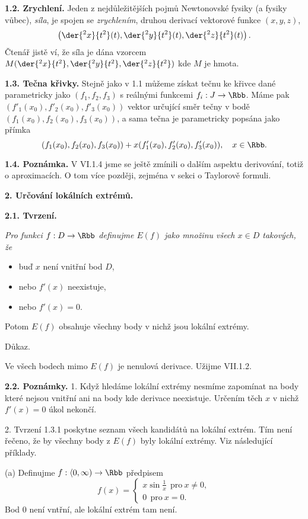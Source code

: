 \documentclass[12pt]{article}
\begin{document}
{{ \bigskip
 
 {\bf 1.2. Zrychlení.} Jeden z nejdůležitějších pojmů Newtonovské fysiky (a fysiky vůbec),   {\em síla}, je spojen se {\em zrychlením}, druhou derivací vektorové funkce $(x,y,z)$,
 $$
 \left(\der{^2x}{t^2}(t),\der{^2y}{t^2}(t),\der{^2z}{t^2}(t)\right).
 $$
Čtenář jistě ví, že síla je dána vzorcem
 $M(\der{^2x}{t^2},\der{^2y}{t^2},\der{^2z}{t^2})$ kde $M$ je hmota.
 
 \bigskip
 
 {\bf 1.3. Tečna křivky.} Stejně jako v 1.1 můžeme získat tečnu ke křivce dané parametricky jako $(f_1,f_2,f_3)$ s reálnými funkcemi $f_i:J\to\Rbb$. Máme pak $(f'_1(x_0),f'_2(x_0),f'_3(x_0))$ vektor určující směr tečny v bodě 
  $(f_1(x_0),f_2(x_0),f_3(x_0))$, a sama tečna je parametricky popsána jako přímka
  $$
 (f_1(x_0),f_2(x_0),f_3(x_0))+ x(f'_1(x_0),f'_2(x_0),f'_3(x_0)),\quad x\in\Rbb.
 $$
 
 \bigskip
 
 {\bf 1.4. Poznámka.} V VI.1.4 jsme se ještě zmínili o dalším aspektu derivování, totiž o aproximacích. O tom více později, zejména v sekci o Taylorově formuli. 
 
 
 \vskip10mm
 
 {\large\bf 2. Určování lokálních extrémů.}
 
 \bigskip
 
 
 {\bf 2.1.  Tvrzení.} {\em Pro funkci $f:D\to \Rbb$ definujme $E(f)$ jako množinu všech $x\in D$ takových, že
 \begin{itemize}
 \item  buď $x$ není vnitřní bod $D$, 
 \item nebo $f'(x)$ neexistuje,
 \item nebo $f'(x)=0$. 
 \end{itemize}
     Potom  $E(f)$ obsahuje všechny body v nichž jsou lokální extrémy.
     
Důkaz.} Ve všech bodech mimo $E(f)$ je nenulová derivace. Užijme VII.1.2. \sq  

\medskip

{\bf 2.2. Poznámky.} 1. Když hledáme lokální extrémy nesmíme zapomínat na body které nejsou vnitřní ani na body kde derivace neexistuje. Určením těch $x$ v nichž$f'(x)=0$ úkol nekončí.

2. Tvrzení 1.3.1 poskytne seznam všech kandidátů na lokální extrém. Tím není řečeno, že by všechny body z $E(f)$ byly lokální extrémy. 
Viz následující příklady.

(a) Definujme $f:\langle 0,\infty)\to \Rbb$ předpisem
$$
 f(x)=\begin{cases} x\sin\frac1{x} \ \ \text{pro} \ x\neq 0,\\
                    0 \ \ \text{pro} \ x=0.\end{cases}
$$  
Bod 0 není vntřní, ale lokální extrém tam není.

}}
\end{document}
